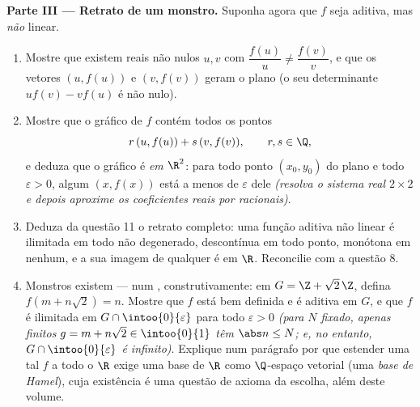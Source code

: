 \begin{problem}[{Problema de fim de semana --- $f(x + y) = f(x) + f(y)$:
a regularidade força a linearidade, e o retrato dos monstros}]
\medskip
\noindent\textbf{Parte III --- Retrato de um monstro.} Suponha
agora que $f$ seja aditiva, mas \emph{não} linear.
\begin{enumerate}
  \item Mostre que existem reais não nulos $u, v$ com
        $\dfrac{f(u)}{u} \neq \dfrac{f(v)}{v}$, e que os
        vetores $(u, f(u))$ e $(v, f(v))$ geram o plano (o seu
        determinante $u f(v) - v f(u)$ é não nulo).
  \item Mostre que o gráfico de $f$ contém todos os pontos
        \[
        r\,(u, f(u)) + s\,(v, f(v)), \qquad r, s \in \Q ,
        \]
        e deduza que o gráfico é \emph{ em $\R^2$}: para
        todo ponto $(x_0, y_0)$ do plano e todo
        $\varepsilon > 0$, algum $(x, f(x))$ está a menos de
        $\varepsilon$ dele \emph{(resolva o sistema real $2\times2$
        e depois aproxime os coeficientes reais por
        racionais)}.
  \item Deduza da questão 11 o retrato completo: uma função aditiva
        não linear é ilimitada em todo  não degenerado,
        descontínua em todo ponto, monótona em  nenhum,
        e a sua imagem de qualquer  é  em
        $\R$. Reconcilie com a questão 8.
  \item Monstros existem --- num  , construtivamente:
        em $G = \Z + \sqrt2\,\Z$, defina $f(m + n\sqrt2) = n$.
        Mostre que $f$ está bem definida e é aditiva em $G$, e que
        $f$ é ilimitada em $G \cap \intoo{0}{\varepsilon}$ para
        todo $\varepsilon > 0$ \emph{(para $N$ fixado, apenas
        finitos $g = m + n\sqrt2 \in \intoo{0}{1}$ têm
        $\abs n \leq N$; e, no entanto, $G \cap \intoo{0}{\varepsilon}$ é
        infinito)}. Explique num parágrafo por que estender uma tal
        $f$ a todo o $\R$ exige uma base de $\R$ como
        $\Q$-espaço vetorial (uma \emph{base de Hamel}), cuja
        existência é uma questão de axioma da escolha, além deste
        volume.
\end{enumerate}


\end{problem}
